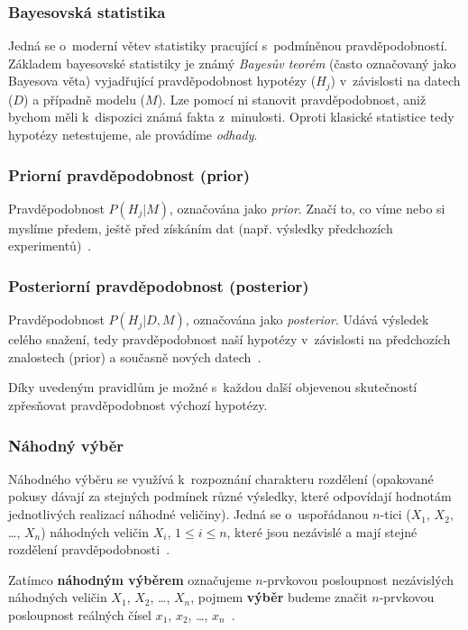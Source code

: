 \documentclass[thesis=M,czech]{FITthesis}[2014/05/07]
\begin{document}
\subsubsection{Bayesovská statistika}
Jedná se o~moderní větev statistiky pracující s~podmíněnou pravděpodobností. Základem bayesovské statistiky je známý \emph{Bayesův teorém} (často označovaný jako Bayesova věta) vyjadřující pravděpodobnost hypotézy ($H_j$) v~závislosti na datech ($D$) a případně modelu ($M$). Lze pomocí ni stanovit pravděpodobnost, aniž bychom měli k~dispozici známá fakta z~minulosti. Oproti klasické statistice tedy hypotézy netestujeme, ale provádíme \emph{odhady}. 

\subsubsection{Priorní pravděpodobnost (prior)}
\label{prior}
Pravděpodobnost $P(H_j | M)$, označována jako \emph{prior}. Značí to, co víme nebo si myslíme předem, ještě před získáním dat (např. výsledky předchozích experimentů)~\cite{pst4}.

\subsubsection{Posteriorní pravděpodobnost (posterior)}
\label{poster}
Pravděpodobnost $P(H_j | D, M)$, označována jako \emph{posterior}. Udává výsledek celého snažení, tedy pravděpodobnost naší hypotézy v~závislosti na předchozích znalostech (prior) a současně nových datech~\cite{pst4}.

Díky uvedeným pravidlům je možné s~každou další objevenou skutečností zpřesňovat pravděpodobnost výchozí hypotézy. 

\subsubsection{Náhodný výběr}
\label{randomvyber}
Náhodného výběru se využívá k~rozpoznání charakteru rozdělení (opakované pokusy dávají za stejných podmínek různé výsledky, které odpovídají hodnotám jednotlivých realizací náhodné veličiny). Jedná se o~uspořádanou $n$-tici ($X_1$, $X_2$, \ldots, $X_n$) náhodných veličin $X_i$, $1 \leq i \leq n$, které jsou nezávislé a mají stejné rozdělení pravděpodobnosti~\cite{pst3}.

Zatímco \textbf{náhodným výběrem} označujeme $n$-prvkovou posloupnost nezávislých náhodných veličin $X_1$, $X_2$, \ldots, $X_n$, pojmem \textbf{výběr} budeme značit $n$-prvkovou posloupnost reálných čísel $x_1$, $x_2$, \ldots, $x_n$~\cite{pst5}. 
\end{document}
